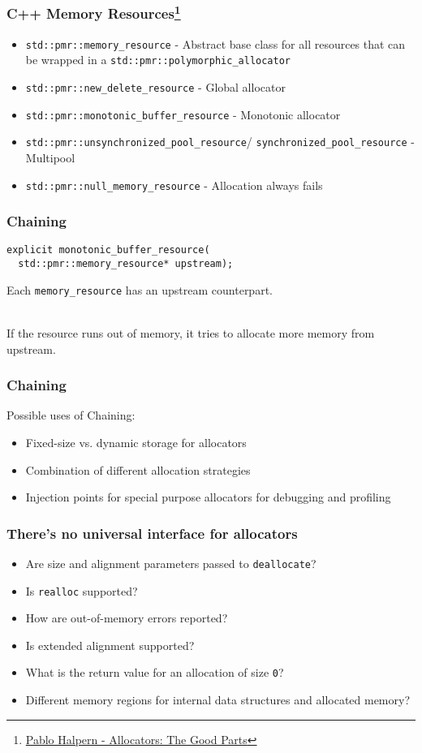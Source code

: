 \documentclass[aspectratio=169]{beamer}
\begin{document}
\begin{frame}[fragile]
  \frametitle{C++ Memory Resources\footnote{\href{https://www.youtube.com/watch?v=v3dz-AKOVL8}{Pablo Halpern - Allocators: The Good Parts}}}

  \begin{itemize}
  \item \texttt{std::pmr::memory\_resource} - Abstract base class for all resources that can be wrapped in a \texttt{std::pmr::polymorphic\_allocator}
  \item \texttt{std::pmr::new\_delete\_resource} - Global allocator
  \item \texttt{std::pmr::monotonic\_buffer\_resource} - Monotonic allocator
  \item \texttt{std::pmr::unsynchronized\_pool\_resource}/ \texttt{synchronized\_pool\_resource} - Multipool
  \item \texttt{std::pmr::null\_memory\_resource} - Allocation always fails
  \end{itemize}
\end{frame}


\begin{frame}[fragile]
  \frametitle{Chaining}
  \begin{lstlisting}
explicit monotonic_buffer_resource(
  std::pmr::memory_resource* upstream);
  \end{lstlisting}

  Each \texttt{memory\_resource} has an upstream counterpart. \\~\

  If the resource runs out of memory, it tries to allocate more memory from upstream.
\end{frame}


\begin{frame}[fragile]
  \frametitle{Chaining}
  Possible uses of Chaining:
  \begin{itemize}
  \item Fixed-size vs. dynamic storage for allocators
  \item Combination of different allocation strategies
  \item Injection points for special purpose allocators for debugging and profiling
  \end{itemize}
\end{frame}


\begin{frame}
  \frametitle{There's no universal interface for allocators}

  \begin{itemize}
  \item Are size and alignment parameters passed to \texttt{deallocate}?
  \item Is \texttt{realloc} supported?
  \item How are out-of-memory errors reported?
  \item Is extended alignment supported?
  \item What is the return value for an allocation of size \texttt{0}?
  \item Different memory regions for internal data structures and allocated memory?
  \end{itemize}
\end{frame}
\end{document}
